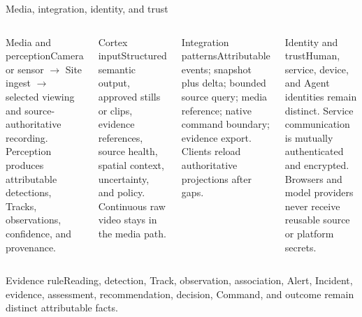 \begin{frame}{Media, integration, identity, and trust}
\begin{columns}[T]
\begin{block}{Media and perception}\small Camera or sensor $\rightarrow$ Site ingest $\rightarrow$ selected viewing and source-authoritative recording. Perception produces attributable detections, Tracks, observations, confidence, and provenance.\end{block}
\begin{block}{Cortex input}\small Structured semantic output, approved stills or clips, evidence references, source health, spatial context, uncertainty, and policy. Continuous raw video stays in the media path.\end{block}
\begin{block}{Integration patterns}\small Attributable events; snapshot plus delta; bounded source query; media reference; native command boundary; evidence export. Clients reload authoritative projections after gaps.\end{block}
\begin{block}{Identity and trust}\small Human, service, device, and Agent identities remain distinct. Service communication is mutually authenticated and encrypted. Browsers and model providers never receive reusable source or platform secrets.\end{block}
\end{columns}
\vspace{2mm}
\begin{block}{Evidence rule}\centering Reading, detection, Track, observation, association, Alert, Incident, evidence, assessment, recommendation, decision, Command, and outcome remain distinct attributable facts.\end{block}
\end{frame}

